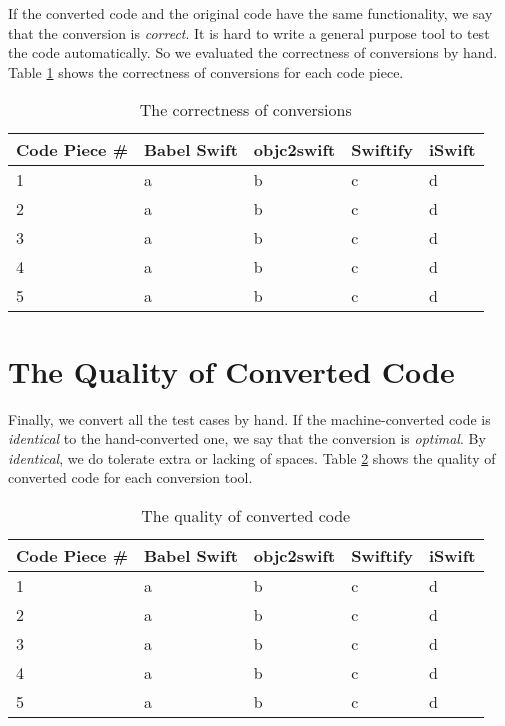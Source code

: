 \documentclass{sfuthesis}
\begin{document}
If the converted code and the original code have the same functionality, we say that the conversion is \emph{correct}. It is hard to write a general purpose tool to test the code automatically. So we evaluated the correctness of conversions by hand. Table \ref{table:correctness} shows the correctness of conversions for each code piece.

\begin{table}[H]
\begin{center}
\begin{tabular}{|l|l|l|l|l|}
\hline
\textbf{Code Piece \#} & Babel Swift & objc2swift & Swiftify & iSwift \\
\hline
1 & a & b & c & d \\
2 & a & b & c & d \\
3 & a & b & c & d \\
4 & a & b & c & d \\
5 & a & b & c & d \\
\hline
\end{tabular}
\end{center}
\caption{The correctness of conversions}
\label{table:correctness}
\end{table}

\section{The Quality of Converted Code}

Finally, we convert all the test cases by hand. If the machine-converted code is \emph{identical} to the hand-converted one, we say that the conversion is \emph{optimal}. By \emph{identical}, we do tolerate extra or lacking of spaces. Table \ref{table:quality} shows the quality of converted code for each conversion tool.

\begin{table}[H]
\begin{center}
\begin{tabular}{|l|l|l|l|l|}
\hline
\textbf{Code Piece \#} & Babel Swift & objc2swift & Swiftify & iSwift \\
\hline
1 & a & b & c & d \\
2 & a & b & c & d \\
3 & a & b & c & d \\
4 & a & b & c & d \\
5 & a & b & c & d \\
\hline
\end{tabular}
\end{center}
\caption{The quality of converted code}
\label{table:quality}
\end{table}
\end{document}
